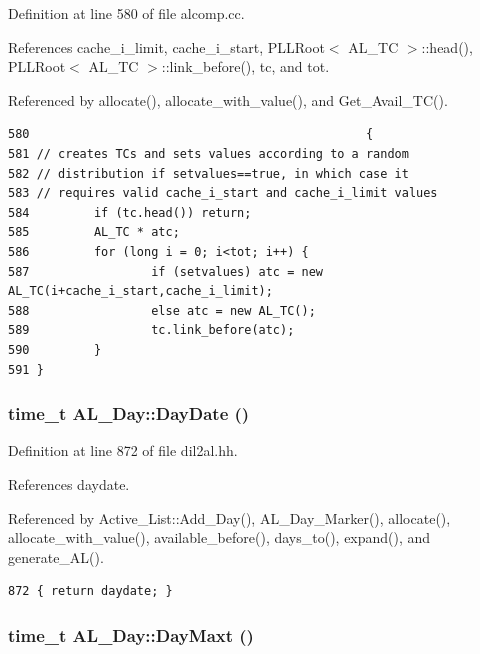 Definition at line 580 of file alcomp.cc.

References cache\_\-i\_\-limit, cache\_\-i\_\-start, PLLRoot$<$ AL\_\-TC $>$::head(), PLLRoot$<$ AL\_\-TC $>$::link\_\-before(), tc, and tot.

Referenced by allocate(), allocate\_\-with\_\-value(), and Get\_\-Avail\_\-TC().



\footnotesize\begin{verbatim}580                                               {
581 // creates TCs and sets values according to a random
582 // distribution if setvalues==true, in which case it
583 // requires valid cache_i_start and cache_i_limit values
584         if (tc.head()) return;
585         AL_TC * atc;
586         for (long i = 0; i<tot; i++) {
587                 if (setvalues) atc = new AL_TC(i+cache_i_start,cache_i_limit);
588                 else atc = new AL_TC();
589                 tc.link_before(atc);
590         }
591 }
\end{verbatim}\normalsize 
{}
\subsubsection{\setlength{\rightskip}{0pt plus 5cm}time\_\-t AL\_\-Day::Day\-Date ()\hspace{0.3cm}{\tt  [inline]}}\label{classAL__Day_a3}




Definition at line 872 of file dil2al.hh.

References daydate.

Referenced by Active\_\-List::Add\_\-Day(), AL\_\-Day\_\-Marker(), allocate(), allocate\_\-with\_\-value(), available\_\-before(), days\_\-to(), expand(), and generate\_\-AL().



\footnotesize\begin{verbatim}872 { return daydate; }
\end{verbatim}\normalsize 
{}
\subsubsection{\setlength{\rightskip}{0pt plus 5cm}time\_\-t AL\_\-Day::Day\-Maxt ()\hspace{0.3cm}{\tt  [inline]}}\label{classAL__Day_a6}




